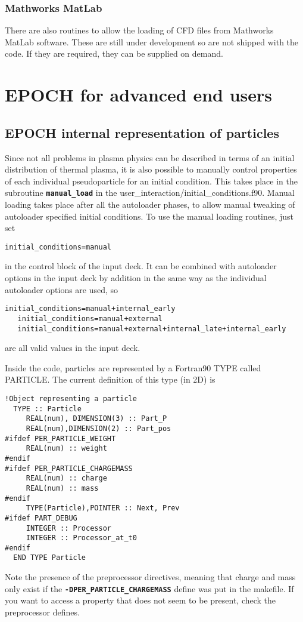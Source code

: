 \documentclass[12pt]{article}
\newcommand{\simpleboxverbatim}{\begin{Verbatim}[obeytabs=true,frame=single,
  framerule=0.5mm,rulecolor=\color{warwickmid}]}
\newcommand{\inlinecode}[1]{{\color{warwickred} \bf\texttt{#1}}}
\newcommand{\EPOCH}{{\color{warwickdark}\fontfamily{phv}\selectfont EPOCH} }
\begin{document}
\subsubsection{Mathworks MatLab}
There are also routines to allow the loading of CFD files from Mathworks
MatLab software. These are still under development so are not shipped with the
code. If they are required, they can be supplied on demand.

\section{\EPOCH for advanced end users}

\subsection{\EPOCH internal representation of particles}
Since not all problems in plasma physics can be described in terms of an
initial distribution of thermal plasma, it is also possible to manually
control properties of each individual pseudoparticle for an initial
condition. This takes place in the subroutine \inlinecode{manual\_load} in the
user\_interaction/initial\_conditions.f90. Manual loading takes place after
all the autoloader phases, to allow manual tweaking of autoloader specified
initial conditions. To use the manual loading routines, just set\\
\simpleboxverbatim
   initial_conditions=manual
\end{Verbatim}
in the control block of the input deck. It can be combined with autoloader
options in the input deck by addition in the same way as the individual
autoloader options are used, so
\simpleboxverbatim
   initial_conditions=manual+internal_early
   initial_conditions=manual+external
   initial_conditions=manual+external+internal_late+internal_early
\end{Verbatim}
are all valid values in the input deck.

Inside the code, particles are represented by a Fortran90 TYPE called
PARTICLE. The current definition of this type (in 2D) is

\simpleboxverbatim
!Object representing a particle
  TYPE :: Particle
     REAL(num), DIMENSION(3) :: Part_P
     REAL(num),DIMENSION(2) :: Part_pos
#ifdef PER_PARTICLE_WEIGHT
     REAL(num) :: weight
#endif
#ifdef PER_PARTICLE_CHARGEMASS
     REAL(num) :: charge
     REAL(num) :: mass
#endif
     TYPE(Particle),POINTER :: Next, Prev
#ifdef PART_DEBUG
     INTEGER :: Processor
     INTEGER :: Processor_at_t0
#endif
  END TYPE Particle
\end{Verbatim}
Note the presence of the preprocessor directives, meaning that charge and mass
only exist if the \inlinecode{-DPER\_PARTICLE\_CHARGEMASS} define was put in
the makefile. If you want to access a property that does not seem to be
present, check the preprocessor defines.
\end{document}

